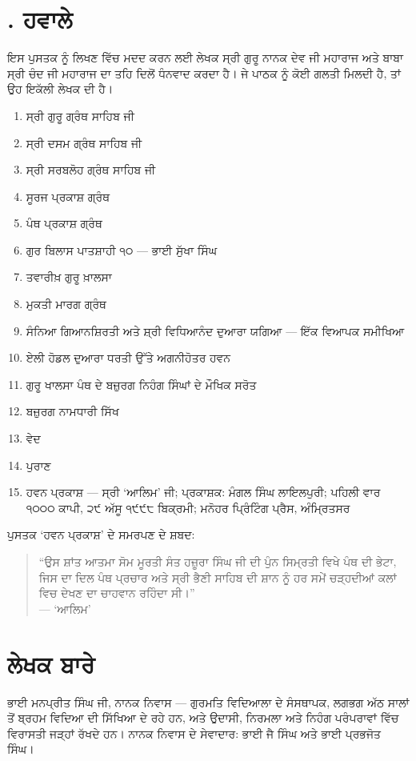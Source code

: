 \documentclass[12pt,a5paper,twoside]{book}  %
\DeclareRobustCommand{\eng}[1]{{\rmfamily #1}}
\begin{document}
{\chapter*{\eng{14.} ਹਵਾਲੇ}
\addcontentsline{toc}{chapter}{\eng{14.} ਹਵਾਲੇ}
ਇਸ ਪੁਸਤਕ ਨੂੰ ਲਿਖਣ ਵਿੱਚ ਮਦਦ ਕਰਨ ਲਈ ਲੇਖਕ ਸ੍ਰੀ ਗੁਰੂ ਨਾਨਕ ਦੇਵ ਜੀ ਮਹਾਰਾਜ ਅਤੇ ਬਾਬਾ ਸ੍ਰੀ ਚੰਦ ਜੀ ਮਹਾਰਾਜ ਦਾ ਤਹਿ ਦਿਲੋਂ ਧੰਨਵਾਦ ਕਰਦਾ ਹੈ। ਜੇ ਪਾਠਕ ਨੂੰ ਕੋਈ ਗਲਤੀ ਮਿਲਦੀ ਹੈ, ਤਾਂ ਉਹ ਇਕੱਲੀ ਲੇਖਕ ਦੀ ਹੈ।
\begin{enumerate}[label=\arabic*.]
    \item ਸ੍ਰੀ ਗੁਰੂ ਗ੍ਰੰਥ ਸਾਹਿਬ ਜੀ
    \item ਸ੍ਰੀ ਦਸਮ ਗ੍ਰੰਥ ਸਾਹਿਬ ਜੀ
    \item ਸ੍ਰੀ ਸਰਬਲੋਹ ਗ੍ਰੰਥ ਸਾਹਿਬ ਜੀ
    \item ਸੂਰਜ ਪ੍ਰਕਾਸ਼ ਗ੍ਰੰਥ
    \item ਪੰਥ ਪ੍ਰਕਾਸ਼ ਗ੍ਰੰਥ
    \item ਗੁਰ ਬਿਲਾਸ ਪਾਤਸ਼ਾਹੀ ੧੦ — ਭਾਈ ਸੁੱਖਾ ਸਿੰਘ
    \item ਤਵਾਰੀਖ਼ ਗੁਰੂ ਖ਼ਾਲਸਾ
    \item ਮੁਕਤੀ ਮਾਰਗ ਗ੍ਰੰਥ
    \item ਸੰਨਿਆ ਗਿਆਨਸ਼ਿਰਤੀ ਅਤੇ ਸ਼੍ਰੀ ਵਿਧਿਆਨੰਦ ਦੁਆਰਾ ਯਗਿਆ — ਇੱਕ ਵਿਆਪਕ ਸਮੀਖਿਆ
    \item ਏਲੀ ਹੋਡਲ ਦੁਆਰਾ ਧਰਤੀ ਉੱਤੇ ਅਗਨੀਹੋਤਰ ਹਵਨ
    \item ਗੁਰੂ ਖਾਲਸਾ ਪੰਥ ਦੇ ਬਜ਼ੁਰਗ ਨਿਹੰਗ ਸਿੰਘਾਂ ਦੇ ਮੌਖਿਕ ਸਰੋਤ
    \item ਬਜ਼ੁਰਗ ਨਾਮਧਾਰੀ ਸਿੱਖ
    \item ਵੇਦ
    \item ਪੁਰਾਣ
    \item ਹਵਨ ਪ੍ਰਕਾਸ਼ — ਸ੍ਰੀ ‘ਆਲਿਮ’ ਜੀ; ਪ੍ਰਕਾਸ਼ਕ: ਮੰਗਲ ਸਿੰਘ ਲਾਇਲਪੁਰੀ; ਪਹਿਲੀ ਵਾਰ ੧੦੦੦ ਕਾਪੀ, ੨੯ ਅੱਸੂ ੧੯੯੮ ਬਿਕ੍ਰਮੀ; ਮਨੋਹਰ ਪ੍ਰਿੰਟਿੰਗ ਪ੍ਰੈਸ, ਅੰਮ੍ਰਿਤਸਰ
\end{enumerate}
\medskip
ਪੁਸਤਕ ‘ਹਵਨ ਪ੍ਰਕਾਸ਼’ ਦੇ ਸਮਰਪਣ ਦੇ ਸ਼ਬਦ:
\begin{quote}
“ਉਸ ਸ਼ਾਂਤ ਆਤਮਾ ਸੋਮ ਮੂਰਤੀ ਸੰਤ ਹਜ਼ੂਰਾ ਸਿੰਘ ਜੀ ਦੀ ਪੁੰਨ ਸਿਮ੍ਰਤੀ ਵਿਖੇ ਪੰਥ ਦੀ ਭੇਟਾ, ਜਿਸ ਦਾ ਦਿਲ ਪੰਥ ਪ੍ਰਚਾਰ ਅਤੇ ਸ੍ਰੀ ਭੈਣੀ ਸਾਹਿਬ ਦੀ ਸ਼ਾਨ ਨੂੰ ਹਰ ਸਮੇਂ ਚੜ੍ਹਦੀਆਂ ਕਲਾਂ ਵਿਚ ਦੇਖਣ ਦਾ ਚਾਹਵਾਨ ਰਹਿੰਦਾ ਸੀ।” \\
\hspace*{\fill}— ‘ਆਲਿਮ’
\end{quote}

\clearpage
\chapter*{ਲੇਖਕ ਬਾਰੇ}
ਭਾਈ ਮਨਪ੍ਰੀਤ ਸਿੰਘ ਜੀ, ਨਾਨਕ ਨਿਵਾਸ — ਗੁਰਮਤਿ ਵਿਦਿਆਲਾ ਦੇ ਸੰਸਥਾਪਕ, ਲਗਭਗ ਅੱਠ ਸਾਲਾਂ ਤੋਂ ਬ੍ਰਹਮ ਵਿਦਿਆ ਦੀ ਸਿੱਖਿਆ ਦੇ ਰਹੇ ਹਨ, ਅਤੇ ਉਦਾਸੀ, ਨਿਰਮਲਾ ਅਤੇ ਨਿਹੰਗ ਪਰੰਪਰਾਵਾਂ ਵਿੱਚ ਵਿਰਾਸਤੀ ਜੜ੍ਹਾਂ ਰੱਖਦੇ ਹਨ। ਨਾਨਕ ਨਿਵਾਸ ਦੇ ਸੇਵਾਦਾਰ: ਭਾਈ ਜੈ ਸਿੰਘ ਅਤੇ ਭਾਈ ਪ੍ਰਭਜੋਤ ਸਿੰਘ।

}
\end{document}
